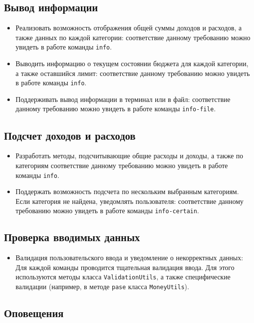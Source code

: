 \documentclass[a4paper, 14pt]{article}
\begin{document}
\subsection{Вывод информации}

\begin{itemize}
	\item Реализовать возможность отображения общей суммы доходов и расходов, а также данных по каждой категории: соответствие данному требованию можно увидеть в работе команды \texttt{info}.
	\item Выводить информацию о текущем состоянии бюджета для каждой категории, а также оставшийся лимит: соответствие данному требованию можно увидеть в работе команды \texttt{info}.
	\item Поддерживать вывод информации в терминал или в файл: соответствие данному требованию можно увидеть в работе команды \texttt{info-file}.
\end{itemize}

\subsection{Подсчет доходов и расходов}

\begin{itemize}
	\item Разработать методы, подсчитывающие общие расходы и доходы, а также по категориям соответствие данному требованию можно увидеть в работе команды \texttt{info}.
	\item Поддержать возможность подсчета по нескольким выбранным категориям. Если категория не найдена, уведомлять пользователя: соответствие данному требованию можно увидеть в работе команды \texttt{info-certain}.
\end{itemize}

\subsection{Проверка вводимых данных}

\begin{itemize}
	\item Валидация пользовательского ввода и уведомление о некорректных данных: Для каждой команды проводится тщательная валидация ввода. Для этого используются методы класса \texttt{ValidationUtils}, а также специфические валидации (например, в методе \texttt{pase} класса \texttt{MoneyUtils}).
\end{itemize}

\subsection{Оповещения}
\end{document}
